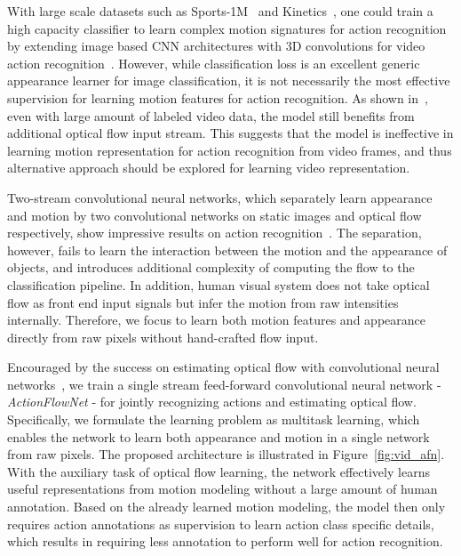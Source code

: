 \documentclass[10pt,twocolumn,letterpaper]{article}
\begin{document}
With large scale datasets such as Sports-1M~\cite{karpathyTSLSF14} and Kinetics~\cite{kay2017kinetics}, one could train a high capacity classifier to learn complex motion signatures for action recognition by extending image based CNN architectures with 3D convolutions for video action recognition~\cite{karpathyTSLSF14,tranBFTP15,carreira2017quo}.
However, while classification loss is an excellent generic appearance learner for image classification, it is not necessarily the most effective supervision for learning motion features for action recognition.
As shown in~\cite{carreira2017quo}, even with large amount of labeled video data, the model still benefits from additional optical flow input stream. This suggests that the model is ineffective in learning motion representation for action recognition from video frames, and thus alternative approach should be explored for learning video representation.


Two-stream convolutional neural networks, which separately learn appearance and motion by two convolutional networks on static images and optical flow respectively, show impressive results on action recognition~\cite{simonyanZ14a}. 
The separation, however, fails to learn the interaction between the motion and the appearance of objects, and introduces additional complexity of computing the flow to the classification pipeline.
In addition, human visual system does not take optical flow as front end input signals but infer the motion from raw intensities internally.
Therefore, we focus to learn both motion features and appearance directly from raw pixels without hand-crafted flow input.


Encouraged by the success on estimating optical flow with convolutional neural networks~\cite{FischerDIHHGSCB15}, we train a single stream feed-forward convolutional neural network - \mbox{\emph{ActionFlowNet}} - for jointly recognizing actions and estimating optical flow.
Specifically, we formulate the learning problem as multitask learning, which enables the network to learn both appearance and motion in a single network from raw pixels.
The proposed architecture is illustrated in Figure~\ref{fig:vid_afn}.
With the auxiliary task of optical flow learning, the network effectively learns useful representations from motion modeling without a large amount of human annotation.
Based on the already learned motion modeling, the model then only requires action annotations as supervision to learn action class specific details, which results in requiring less annotation to perform well for action recognition.
\end{document}
